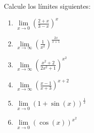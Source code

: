 \begin{exercise}
	Calcule los l\'imites siguientes:
	\begin{multicols}{2}
		\begin{enumerate}
			\item \(\lim\limits_{x\to 0}\left(\frac{2+x}{3-x}\right)^x\)
			\item \(\lim\limits_{x\to \infty}\left(\frac{1}{x^2}\right)^{\frac{2x}{x+1}}\)
			\item \(\lim\limits_{x\to\infty}\left(\frac{x^2+2}{2x^2+1}\right)^{x^2}\)
			\item \(\lim\limits_{x\to\infty}\left(\frac{x-1}{x+3}\right)^{x+2}\)
			\item \(\lim\limits_{x\to 0}\left(1+\sin(x)\right)^{\frac{1}{x}}\)
			\item \(\lim\limits_{x\to 0}\left(\cos(x)\right)^{x^2}\)
		\end{enumerate}
	\end{multicols}
\end{exercise}



